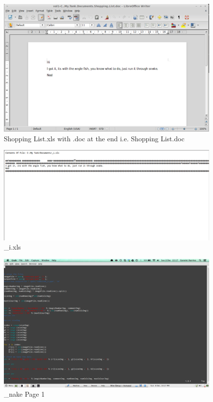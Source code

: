 \documentclass[12pt]{article}
\begin{document}
				\begin{figure}[ht!]
					\centering
					\includegraphics[width=12cm]{Images/ShoppingListWord.png}
					\caption{Shopping List.xls with .doc at the end i.e. Shopping List.doc}
				\end{figure}

				\begin{figure}[ht!]
					\centering
					\includegraphics[width=12cm]{Images/_i.png}
					\caption{\_i.xls}
				\end{figure}

				\begin{figure}[ht!]
					\centering
					\includegraphics[width=12cm]{Images/_nape1.png}
					\caption{\_nake Page 1}
				\end{figure}
\end{document}
